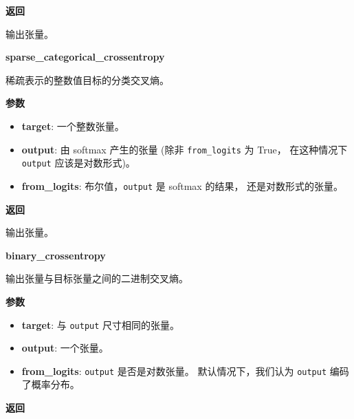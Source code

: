 \textbf{返回}

输出张量。


\textbf{sparse\_categorical\_crossentropy}\label{sparseux5fcategoricalux5fcrossentropy}

\begin{Shaded}
\begin{Highlighting}[]
\OperatorTok{=}\NormalTok{)}
\end{Highlighting}
\end{Shaded}

稀疏表示的整数值目标的分类交叉熵。

\textbf{参数}

\begin{itemize}
\tightlist
\item
  \textbf{target}: 一个整数张量。
\item
  \textbf{output}: 由 softmax 产生的张量 (除非 \texttt{from\_logits} 为
  True， 在这种情况下 \texttt{output} 应该是对数形式)。
\item
  \textbf{from\_logits}: 布尔值，\texttt{output} 是 softmax 的结果，
  还是对数形式的张量。
\end{itemize}

\textbf{返回}

输出张量。


\textbf{binary\_crossentropy}\label{binaryux5fcrossentropy}

\begin{Shaded}
\begin{Highlighting}[]
\OperatorTok{=}\NormalTok{)}
\end{Highlighting}
\end{Shaded}

输出张量与目标张量之间的二进制交叉熵。

\textbf{参数}

\begin{itemize}
\tightlist
\item
  \textbf{target}: 与 \texttt{output} 尺寸相同的张量。
\item
  \textbf{output}: 一个张量。
\item
  \textbf{from\_logits}: \texttt{output} 是否是对数张量。
  默认情况下，我们认为 \texttt{output} 编码了概率分布。
\end{itemize}

\textbf{返回}

